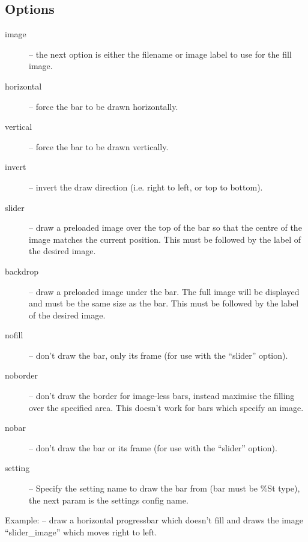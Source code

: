\subsection{Options}
\begin{description}
  \item[image] -- the next option is either the filename or image label to
    use for the fill image.
  \item[horizontal] -- force the bar to be drawn horizontally.
  \item[vertical] -- force the bar to be drawn vertically.
  \item[invert] -- invert the draw direction (i.e. right to left, or top to
    bottom).
  \item[slider] -- draw a preloaded image over the top of the bar so that
    the centre of the image matches the current position. This must be
    followed by the label of the desired image.
  \item[backdrop] -- draw a preloaded image under the bar. The full
    image will be displayed and must be the same size as the bar.
    This must be followed by the label of the desired image.
  \item[nofill] -- don't draw the bar, only its frame (for use with the
     ``slider'' option).
  \item[noborder] -- don't draw the border for image-less bars, instead maximise
    the filling over the specified area. This doesn't work for bars which
    specify an image.
  \item[nobar] -- don't draw the bar or its frame (for use with the
    ``slider'' option).
  \item[setting] -- Specify the setting name to draw the bar from (bar must be
    \%St type), the next param is the settings config name.
\end{description}

Example:  -- draw
a horizontal progressbar which doesn't fill and draws the image
``slider\_image'' which moves right to left.


